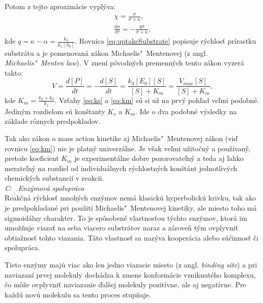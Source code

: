 \documentclass[11pt,final,oneside]{fithesis}
\begin{document}
Potom z tejto aproxim\'acie vypl\'yva:
\begin{align}
\chi = \frac{\sigma}{\sigma + \kappa},\\
\label{eq:uptakeSubstrate}
\frac{d\sigma}{d\tau} = -\frac{q\sigma}{\sigma + \kappa},
\end{align}
kde $q = \kappa - \alpha = \frac{k_3}{k_1[S_0]}$. Rovnica \ref{eq:uptakeSubstrate} popisuje r\'ychlos\v t pr\'irastku substr\'atu a je pomenovan\'a 
z\'akon Michaelis"~Mentenovej (z angl. \textit{Michaelis"~Menten law}). V znen\'i p\^ ovodn\'ych premenn\'ych tento z\'akon vyzer\'a takto:
\begin{equation}
\label{eq:km}
V = \frac{d[P]}{dt} = -\frac{d[S]}{dt} = \frac{k_3[E_0][S]}{[S] + K_m} = \frac{V_{max}[S]}{[S] + K_m},
\end{equation}
kde $K_m = \frac{k_2 + k_3}{k_1}$. Vz\v tahy \ref{eq:ks} a \ref{eq:km} s\'u si u\v z na prv\'y poh\v lad ve\v lmi podobn\'e. Jedin\'ym rozdielom s\'u
kon\v stanty $K_s$ a $K_m$. Ide o dva podobn\'e v\'ysledky na z\'aklade r\^ oznych predpokladov.

Tak ako z\'akon o mass action kinetike aj Michaelis"~Mentenovej z\'akon (vi\v d rovnicu \ref{eq:km}) nie je platn\'y univerz\'alne. Je v\v sak ve\v lmi u\v zito\v cn\'y 
a pou\v z\'ivan\'y, preto\v ze koeficient $K_m$ je experiment\'alne dobre pozorovate\v ln\'y a teda aj \v lahko merate\v ln\'y na rozdiel od individu\'alnych
r\'ychlostn\'ych kon\v st\'ant jednotliv\'ych chemick\'ych substanci\'i v reakcii. \cite{Keener:1998:MP:Enzymes}
\\

\noindent
\textit{C: \ Enz\'ymov\'a spolupr\'aca}
\\

Reak\v cn\'a r\'ychlos\v t mnoh\'ych enz\'ymov nem\'a klasick\'u hyperbolick\'u kriv\-ku, tak ako je predpokladan\'e pri pou\v zit\'i Michaelis"~Mentenovej 
kinetiky, ale miesto toho m\'a sigmoid\'alny charakter. To je sp\^ osoben\'e vlastnos\v tou t\'ychto enz\'ymov, ktor\'a im umo\v z\v nuje viaza\v t na seba
viacero substr\'atov naraz a z\'arove\v n t\'ym ovplyvni\v t obtia\v znos\v t tohto viazania. T\'ato vlastnos\v t sa naz\'yva kooper\'acia alebo 
s\'u\v cinnos\v t \v ci spolupr\'aca.

Tieto enz\'ymy maj\'u viac ako len jedno viazacie miesto (z angl. \textit{binding site}) a pri naviazan\'i prvej molekuly doch\'adza k zmene konform\'acie 
vzniknut\'eho komplexu, \v co m\^ o\v ze ovplyvni\v t naviazanie \v dal\v sej molekuly pozit\'ivne, ale aj negat\'ivne. Pre ka\v zd\'u nov\'u molekulu sa 
tento proces stup\v nuje.
\end{document}
